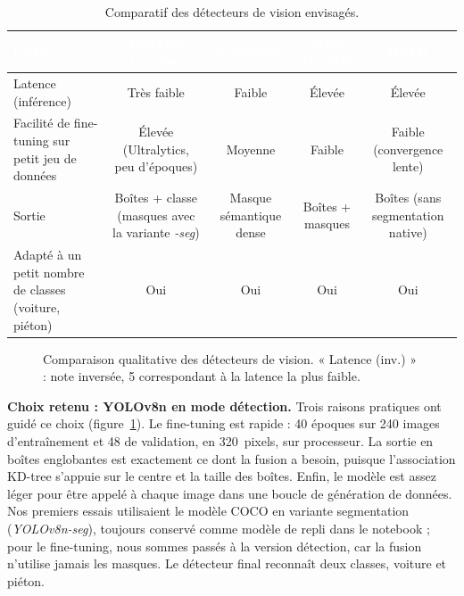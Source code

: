 \documentclass[12pt,a4paper,titlepage]{article}
\newcommand{\hd}[1]{\textcolor{white}{\textbf{#1}}}
\begin{document}
\begin{table}[H]
    \centering
    \caption{Comparatif des détecteurs de vision envisagés.}
    \begin{tabularx}{\textwidth}{F{3.2cm}CCCC}
        \toprule
        \hd{Critère} & \hd{YOLOv8 (retenu)} & \hd{SegFormer} & \hd{Mask R-CNN} & \hd{DETR} \\
        \midrule
        Latence (inférence) & Très faible & Faible & Élevée & Élevée \\
        Facilité de fine-tuning sur petit jeu de données & Élevée (Ultralytics, peu d'époques) & Moyenne & Faible & Faible (convergence lente) \\
        Sortie & Boîtes + classe (masques avec la variante \textit{-seg}) & Masque sémantique dense & Boîtes + masques & Boîtes (sans segmentation native) \\
        Adapté à un petit nombre de classes (voiture, piéton) & Oui & Oui & Oui & Oui \\
        \bottomrule
    \end{tabularx}
\end{table}

\begin{figure}[H]
    \centering
    \caption{Comparaison qualitative des détecteurs de vision. « Latence (inv.) » : note inversée, 5 correspondant à la latence la plus faible.}
    \label{fig:chart_detecteur}
\end{figure}

\textbf{Choix retenu : YOLOv8n en mode détection.} Trois raisons pratiques ont guidé ce choix (figure~\ref{fig:chart_detecteur}). Le fine-tuning est rapide : 40 époques sur 240 images d'entraînement et 48 de validation, en 320~pixels, sur processeur. La sortie en boîtes englobantes est exactement ce dont la fusion a besoin, puisque l'association KD-tree s'appuie sur le centre et la taille des boîtes. Enfin, le modèle est assez léger pour être appelé à chaque image dans une boucle de génération de données. Nos premiers essais utilisaient le modèle COCO en variante segmentation (\textit{YOLOv8n-seg}), toujours conservé comme modèle de repli dans le notebook ; pour le fine-tuning, nous sommes passés à la version détection, car la fusion n'utilise jamais les masques. Le détecteur final reconnaît deux classes, voiture et piéton.
\end{document}
